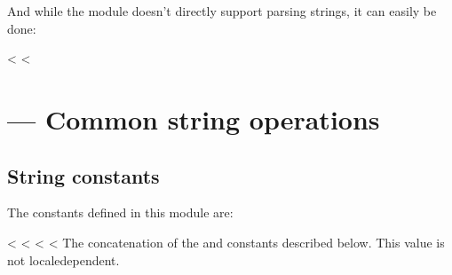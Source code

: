 \documentclass[letterpaper,10pt,english]{sphinxmanual}
\begin{document}
And while the module doesn’t directly support parsing strings, it can easily be
done:

\begin{sphinxVerbatim}[commandchars=\\\{\}]
 
   \PYG{p}{[}\PYG{p}{]}
\end{sphinxVerbatim}

<%
<%

\chapter{ — Common string operations}
\label{\detokenize{string:module-string}}\label{\detokenize{string:string-common-string-operations}}\label{\detokenize{string::doc}}

\section{String constants}
\label{\detokenize{string:string-constants}}
The constants defined in this module are:

\vspace{5px}

\begin{fulllineitems}
\label{\detokenize{string:string.ascii_letters}}<%
\pysigstartsignatures
<%
<%
<%
The concatenation of the {\hyperref[\detokenize{string:string.ascii_lowercase}]{}} and {\hyperref[\detokenize{string:string.ascii_uppercase}]{}}
constants described below.  This value is not locale\sphinxhyphen{}dependent.

\end{fulllineitems}
\end{document}
